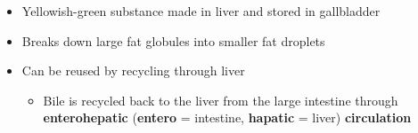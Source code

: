\documentclass[12pt]{article}
\begin{document}
\begin{itemize}
                    \begin{itemize}
                        \item Yellowish-green substance made in liver and stored in gallbladder
                        \item Breaks down large fat globules into smaller fat droplets
                        \item Can be reused by recycling through liver
                            \begin{itemize}
                                \item Bile is recycled back to the liver from the large intestine through \textbf{enterohepatic} (\textbf{entero} = intestine, \textbf{hapatic} = liver) \textbf{circulation}
                            \end{itemize}
                    \end{itemize}
            \end{itemize}
\end{document}
